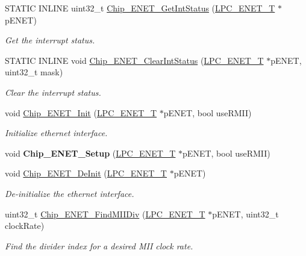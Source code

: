 \begin{DoxyCompactItemize}
S\+T\+A\+T\+I\+C I\+N\+L\+I\+N\+E uint32\+\_\+t \hyperlink{group___e_n_e_t__17_x_x__40_x_x_ga5931404e2db29a1b4cdf357edf79504d}{Chip\+\_\+\+E\+N\+E\+T\+\_\+\+Get\+Int\+Status} (\hyperlink{struct_l_p_c___e_n_e_t___t}{L\+P\+C\+\_\+\+E\+N\+E\+T\+\_\+\+T} $\ast$p\+E\+N\+E\+T)
\begin{DoxyCompactList}\small\item\em Get the interrupt status. \end{DoxyCompactList}\item 
S\+T\+A\+T\+I\+C I\+N\+L\+I\+N\+E void \hyperlink{group___e_n_e_t__17_x_x__40_x_x_ga0a574e2cc8946c200d71152722ac30d7}{Chip\+\_\+\+E\+N\+E\+T\+\_\+\+Clear\+Int\+Status} (\hyperlink{struct_l_p_c___e_n_e_t___t}{L\+P\+C\+\_\+\+E\+N\+E\+T\+\_\+\+T} $\ast$p\+E\+N\+E\+T, uint32\+\_\+t mask)
\begin{DoxyCompactList}\small\item\em Clear the interrupt status. \end{DoxyCompactList}\item 
void \hyperlink{group___e_n_e_t__17_x_x__40_x_x_ga24a13ad31f70570906a4b885754f8953}{Chip\+\_\+\+E\+N\+E\+T\+\_\+\+Init} (\hyperlink{struct_l_p_c___e_n_e_t___t}{L\+P\+C\+\_\+\+E\+N\+E\+T\+\_\+\+T} $\ast$p\+E\+N\+E\+T, bool use\+R\+M\+I\+I)
\begin{DoxyCompactList}\small\item\em Initialize ethernet interface. \end{DoxyCompactList}\item 
\hypertarget{group___e_n_e_t__17_x_x__40_x_x_ga2be4cd438f592e2ea541d726a9d32e14}{void {\bfseries Chip\+\_\+\+E\+N\+E\+T\+\_\+\+Setup} (\hyperlink{struct_l_p_c___e_n_e_t___t}{L\+P\+C\+\_\+\+E\+N\+E\+T\+\_\+\+T} $\ast$p\+E\+N\+E\+T, bool use\+R\+M\+I\+I)}\label{group___e_n_e_t__17_x_x__40_x_x_ga2be4cd438f592e2ea541d726a9d32e14}

\item 
void \hyperlink{group___e_n_e_t__17_x_x__40_x_x_ga94eb7a70f4023c83ca18e4e675ad0b32}{Chip\+\_\+\+E\+N\+E\+T\+\_\+\+De\+Init} (\hyperlink{struct_l_p_c___e_n_e_t___t}{L\+P\+C\+\_\+\+E\+N\+E\+T\+\_\+\+T} $\ast$p\+E\+N\+E\+T)
\begin{DoxyCompactList}\small\item\em De-\/initialize the ethernet interface. \end{DoxyCompactList}\item 
uint32\+\_\+t \hyperlink{group___e_n_e_t__17_x_x__40_x_x_gad107338dec5ee221957fafe5e711e42e}{Chip\+\_\+\+E\+N\+E\+T\+\_\+\+Find\+M\+I\+I\+Div} (\hyperlink{struct_l_p_c___e_n_e_t___t}{L\+P\+C\+\_\+\+E\+N\+E\+T\+\_\+\+T} $\ast$p\+E\+N\+E\+T, uint32\+\_\+t clock\+Rate)
\begin{DoxyCompactList}\small\item\em Find the divider index for a desired M\+I\+I clock rate. \end{DoxyCompactList}\end{DoxyCompactItemize}


